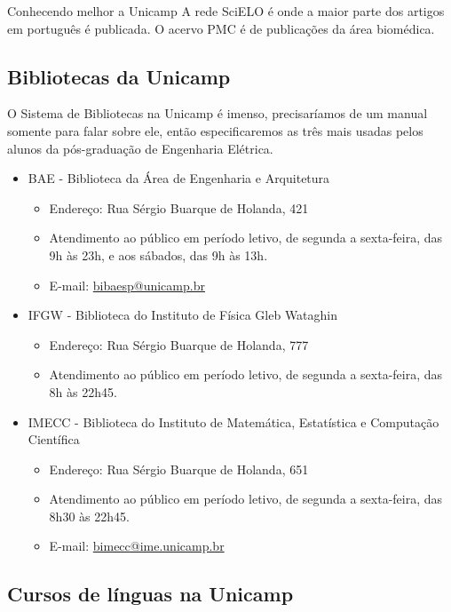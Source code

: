 \begin{story}{Conhecendo melhor a Unicamp}
A rede SciELO é onde a maior parte dos artigos em português é publicada. O acervo PMC é de publicações da área biomédica.

\subsection*{Bibliotecas da Unicamp}

O Sistema de Bibliotecas na Unicamp é imenso, precisaríamos de um manual somente para falar sobre ele, então especificaremos as três mais usadas pelos alunos da pós-graduação de Engenharia Elétrica.

\begin{itemize}

\item BAE - Biblioteca da Área de Engenharia e Arquitetura
\begin{itemize}
\item Endereço: Rua Sérgio Buarque de Holanda, 421
\item Atendimento ao público em período letivo, de segunda a sexta-feira, das 9h às 23h, e aos sábados, das 9h às 13h.
\item E-mail: \url{bibaesp@unicamp.br}
\end{itemize}

\item IFGW - Biblioteca do Instituto de Física Gleb Wataghin
\begin{itemize}
\item Endereço: Rua Sérgio Buarque de Holanda, 777
\item Atendimento ao público em período letivo, de segunda a sexta-feira, das 8h às 22h45.
\end{itemize}

\item IMECC - Biblioteca do Instituto de Matemática, Estatística e Computação Científica
\begin{itemize}
\item Endereço: Rua Sérgio Buarque de Holanda, 651
\item Atendimento ao público em período letivo, de segunda a sexta-feira, das 8h30 às 22h45.
\item E-mail: \url{bimecc@ime.unicamp.br}
\end{itemize}

\end{itemize}

\subsection*{Cursos de línguas na Unicamp}


\end{story}
